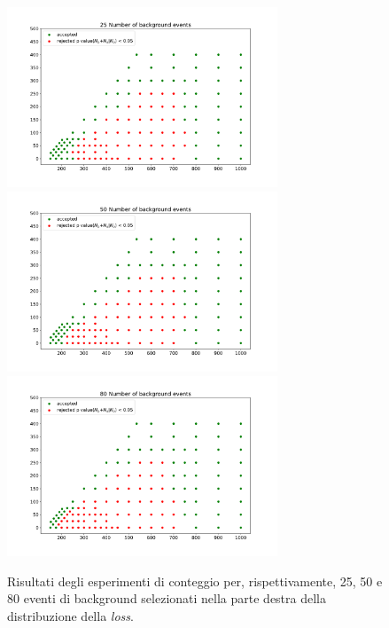 \newpage

\begin{figure}[h!]
	\centering
	\includegraphics[width=0.72\textwidth]{figs/risultati_simulazione/25.pdf}
	\includegraphics[width=0.72\textwidth]{figs/risultati_simulazione/50.pdf}
	\includegraphics[width=0.72\textwidth]{figs/risultati_simulazione/80.pdf}
	\caption{Risultati degli esperimenti di conteggio per, rispettivamente, 25, 50 e 80 eventi di background selezionati nella parte destra della distribuzione della \textit{loss}.}
	\label{test-25-50-80}
\end{figure}
